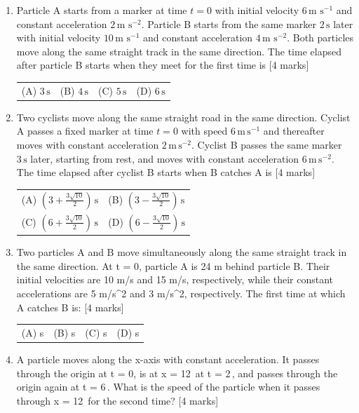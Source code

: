 \documentclass[11pt,a4paper]{article}
\begin{document}
\begin{enumerate}[resume]
{\begin{tabularx}{\linewidth}{X X X X}
\end{tabularx}}
\item Particle A starts from a marker at time $t=0$ with initial velocity $6\,\text{m s}^{-1}$ and constant acceleration $2\,\text{m s}^{-2}$. Particle B starts from the same marker $2\,\text{s}$ later with initial velocity $10\,\text{m s}^{-1}$ and constant acceleration $4\,\text{m s}^{-2}$. Both particles move along the same straight track in the same direction. The time elapsed after particle B starts when they meet for the first time is \hfill [4 marks]
{\renewcommand{\arraystretch}{1.8}
\begin{tabularx}{\linewidth}{X X X X}
(A) \quad $3\,\text{s}$ & (B) \quad $4\,\text{s}$ & (C) \quad $5\,\text{s}$ & (D) \quad $6\,\text{s}$ \\[10pt]
\end{tabularx}}
\item Two cyclists move along the same straight road in the same direction. Cyclist A passes a fixed marker at time $t=0$ with speed $6\,\mathrm{m\,s^{-1}}$ and thereafter moves with constant acceleration $2\,\mathrm{m\,s^{-2}}$. Cyclist B passes the same marker $3\,\mathrm{s}$ later, starting from rest, and moves with constant acceleration $6\,\mathrm{m\,s^{-2}}$. The time elapsed after cyclist B starts when B catches A is \hfill [4 marks]
{\renewcommand{\arraystretch}{1.8}
\begin{tabularx}{\linewidth}{X X}
(A) \quad $\left(3+\frac{3\sqrt{10}}{2}\right)\,\mathrm{s}$ & (B) \quad $\left(3-\frac{3\sqrt{10}}{2}\right)\,\mathrm{s}$ \\[10pt]
(C) \quad $\left(6+\frac{3\sqrt{10}}{2}\right)\,\mathrm{s}$ & (D) \quad $\left(6-\frac{3\sqrt{10}}{2}\right)\,\mathrm{s}$ \\[10pt]
\end{tabularx}}
\item Two particles A and B move simultaneously along the same straight track in the same direction. At t = 0, particle A is 24 m behind particle B. Their initial velocities are 10 m/s and 15 m/s, respectively, while their constant accelerations are 5 m/s^2 and 3 m/s^2, respectively. The first time at which A catches B is: \hfill [4 marks]
{\renewcommand{\arraystretch}{1.8}
\begin{tabularx}{\linewidth}{X X X X}
(A) \quad 4 s & (B) \quad 6 s & (C) \quad 8 s & (D) \quad 10 s \\[10pt]
\end{tabularx}}
\item A particle moves along the x-axis with constant acceleration. It passes through the origin at t = 0, is at x = 12\, at t = 2\,, and passes through the origin again at t = 6\,. What is the speed of the particle when it passes through x = 12\, for the second time? \hfill [4 marks]

\end{enumerate}
\end{document}

